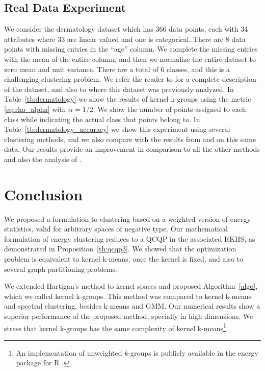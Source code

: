 \documentclass[10pt,journal,compsoc]{IEEEtran}
\begin{document}
\subsection{Real Data Experiment}

We consider the dermatology dataset \cite{Dua2017,Guvenir1998}
which has 366 data points, each with 34 attributes where 33 are
linear valued and one is categorical. There are 8 data points with
missing entries in the ``age'' column. We complete the missing entries
with the mean of the entire column, and then we normalize the entire
dataset to zero mean and unit variance. There are  a total of $6$ classes,
and this is a challenging clustering problem. We refer the reader
to \cite{Dua2017,Guvenir1998} for a complete description of the dataset, 
and also to \cite{RizzoClustering} where this dataset was previously
analyzed. In Table~\ref{tb:dermatology} we show the results of kernel
k-groups using the metric \eqref{eq:rho_alpha} with $\alpha=1/2$.
We show the number of points assigned to each class while indicating
the actual class that points belong to. In Table~\ref{tb:dermatology_accuracy}
we show this experiment using several clustering methods, and we also
compare with the results from \cite{RizzoClustering} and \cite{Kgroups}
on this same data. Our results provide an improvement in comparison
to all the other methods and also the analysis
of \cite{RizzoClustering}.




\section{Conclusion}
\label{sec:conclusion}

We proposed a formulation to clustering based on a weighted
version of energy statistics, 
valid for arbitrary spaces of negative type.
Our mathematical formulation of energy clustering 
reduces to a QCQP in the associated RKHS, as demonstrated in 
Proposition~\ref{th:qcqp3}.
We showed that the optimization problem
is equivalent
to kernel k-means, once the kernel is fixed, and also
to several graph partitioning problems.

We extended Hartigan's method to kernel spaces and proposed
Algorithm~\ref{algo}, which we called kernel k-groups.
This method was compared to kernel k-means and spectral clustering, besides
k-means and GMM. Our numerical results show a superior performance of the
proposed method, specially in high dimensions.
We stress that kernel k-groups has the same complexity of kernel
k-means\footnote{
An implementation of unweighted $k$-groups is publicly available in the
energy package for R \cite{energy}.}.
\end{document}
